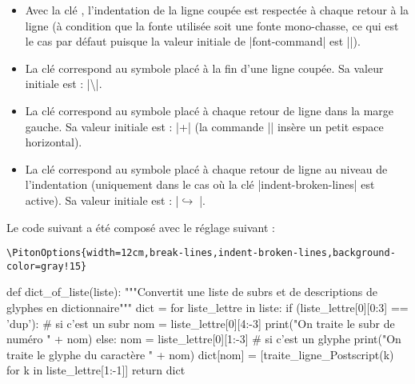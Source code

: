 \documentclass[dvipsnames,svgnames]{article}
\begin{document}
\begin{itemize}
\item {} Avec la clé ,
l'indentation de la ligne coupée est respectée à chaque retour à la ligne (à condition que
la fonte utilisée soit une fonte mono-chasse, ce qui est le cas par défaut puisque la
valeur initiale de |font-command| est |\ttfamily|).

\item {} La clé  correspond au
symbole placé à la fin d'une ligne coupée. Sa valeur initiale est :
|\hspace*{0.5em}\textbackslash|.

\item {} La clé  correspond au
symbole placé à chaque retour de ligne dans la marge gauche. Sa valeur initiale est :
|+\;| (la commande |\;| insère un petit espace horizontal).

\item {} La clé
 correspond au symbole placé à chaque
retour de ligne au niveau de l'indentation (uniquement dans le cas où la clé
|indent-broken-lines| est active). Sa valeur initiale est : |$\hookrightarrow\;$|.
\end{itemize}

\bigskip
Le code suivant a été composé avec le réglage suivant :  

\begin{Verbatim}
\PitonOptions{width=12cm,break-lines,indent-broken-lines,background-color=gray!15}
\end{Verbatim}


\begin{center}
\begin{Piton}
def dict_of_liste(liste):
    """Convertit une liste de subrs et de descriptions de glyphes en dictionnaire"""
    dict = {}
    for liste_lettre in liste:
        if (liste_lettre[0][0:3] == 'dup'): # si c'est un subr
            nom = liste_lettre[0][4:-3]
            print("On traite le subr de numéro " + nom)
        else:
            nom = liste_lettre[0][1:-3] # si c'est un glyphe
            print("On traite le glyphe du caractère " + nom)
        dict[nom] = [traite_ligne_Postscript(k) for k in liste_lettre[1:-1]]
    return dict
\end{Piton}
\end{center}
\end{document}
